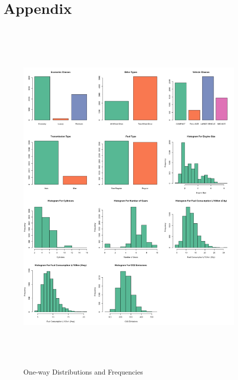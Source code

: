 \documentclass[11pt]{article}
\begin{document}
\printbibliography

\newpage

\section*{Appendix}


\begin{figure}[ht!]
\centering
\includegraphics[height = 180mm, width=160mm]{one_way_EDA.png}
\caption{One-way Distributions and Frequencies}
\end{figure}
\end{document}
